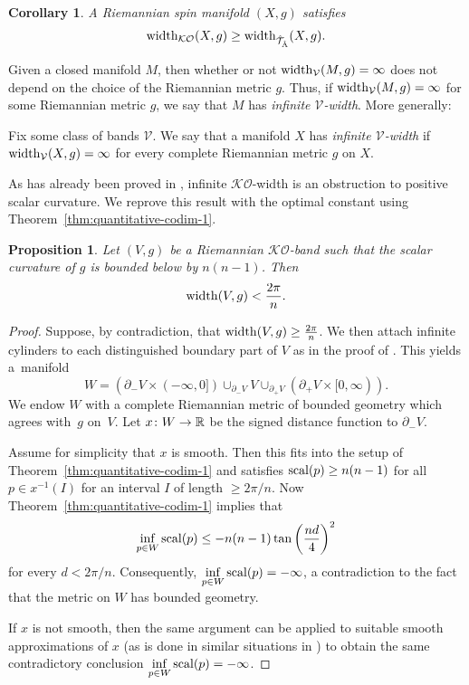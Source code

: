\documentclass[pdftex]{sigma}
\numberwithin{equation}{section}
\newtheorem{Corollary}[Theorem]{Corollary}
\newtheorem{Proposition}[Theorem]{Proposition}
\begin{document}
\begin{Corollary}\label{cor:KO-width-bound-Ahat}
 A Riemannian spin manifold \((X,g)\) satisfies
 \[
 \operatorname{width}_{\mathcal{KO}}(X, g) \geq \operatorname{width}_{\hat{\mathcal{T}}_{\hat{\mathrm{A}}}}(X, g).
 \]
\end{Corollary}

Given a closed manifold \(M\), then whether or not \(\operatorname{width}_{\mathcal{V}}(M, g) = \infty\) does not depend on the choice of the Riemannian metric \(g\).
Thus, if \(\operatorname{width}_{\mathcal{V}}(M, g) = \infty\) for some Riemannian metric \(g\), we say that \(M\) has \emph{infinite \(\mathcal{V}\)-width}.
More generally:
\begin{Definition}
 Fix some class of bands \(\mathcal{V}\).
 We say that a manifold \(X\) has \emph{infinite \(\mathcal{V}\)-width} if \(\operatorname{width}_{\mathcal{V}}(X, g) = \infty\) for every complete Riemannian metric \(g\) on \(X\).
\end{Definition}

As has already been proved in \cite{Zeidler:band-width-estimates}, infinite \(\mathcal{KO}\)-width is an obstruction to positive scalar curvature.
We reprove this result with the optimal constant using Theorem~\ref{thm:quantitative-codim-1}.

\begin{Proposition} \label{cor:KOBandEstimate}
 Let \((V,g)\) be a Riemannian \(\mathcal{KO}\)-band such that the scalar curvature of \(g\) is bounded below by \(n(n-1)\).
 Then
 \[
 \operatorname{width}(V,g) < \frac{2 \pi}{n}.
 \]
 \end{Proposition}
 \begin{proof}
 Suppose, by contradiction, that \(\operatorname{width}(V,g) \geq \frac{2\pi}{n}\).
 We then attach infinite cylinders to each distinguished boundary part of \(V\) as in the proof of \cite[Theorem~3.3]{Zeidler:band-width-estimates}.
 This yields a~manifold
 \[W = (\partial_- V \times (-\infty, 0]) \cup_{\partial_- V} V \cup_{\partial_+ V} (\partial_+ V \times [0,\infty)).\]
 We endow \(W\) with a complete Riemannian metric of bounded geometry which agrees with~\(g\) on~\(V\).
 Let \(x \colon W \to \mathbb{R}\) be the signed distance function to \(\partial_- V\).

 Assume for simplicity that \(x\) is smooth.
 Then this fits into the setup of Theorem~\ref{thm:quantitative-codim-1} and satisfies \(\operatorname{scal}(p) \geq n(n-1)\) for all \(p \in x^{-1}(I)\) for an interval \(I\) of length \(\geq 2 \pi / n\).
 Now Theorem~\ref{thm:quantitative-codim-1} implies that
 \[
 \inf_{p \in W} \operatorname{scal}(p) \leq - n(n-1) \tan\left(\frac{nd}{4}\right)^2
 \]
 for every \(d < 2 \pi /n\).
 Consequently, \(\inf\limits_{p \in W} \operatorname{scal}(p) = -\infty\), a contradiction to the fact that the metric on \(W\) has bounded geometry.

 If \(x\) is not smooth, then the same argument can be applied to suitable smooth approximations of \(x\) (as is done in similar situations in \cite{Cecchini:LongNeck,Zeidler:band-width-estimates}) to obtain the same contradictory conclusion \(\inf\limits_{p \in W} \operatorname{scal}(p) = -\infty\).
 \end{proof}
\end{document}
